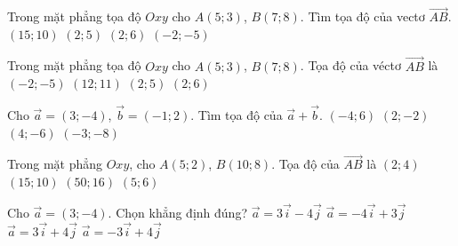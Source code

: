 

\begin{ex}%
	Trong mặt phẳng tọa độ $Oxy$ cho  $A(5; 3)$, $B(7; 8)$. Tìm tọa độ của vectơ $\overrightarrow{AB}$.
	 \choice
		 {$(15; 10)$}
		{\True $(2;  5)$}
		{$(2; 6)$} 
		 {$(-2;-5)$}
\end{ex}

\begin{ex}%
	Trong mặt phẳng tọa độ  $Oxy$ cho $A(5; 3)$, $B(7; 8)$. Tọa độ của véctơ $\overrightarrow{AB}$ là
	 \choice
		 {$(-2;-5)$}
		 {$(12; 11)$}
		{\True $(2;  5)$}
		{$(2; 6)$} 
\end{ex}

\begin{ex}%
	Cho $\overrightarrow{a}=(3;-4)$, $\overrightarrow{b}=(-1; 2)$. Tìm tọa độ  của $\overrightarrow{a}+\overrightarrow{b}$.
	 \choice
		{$(-4;  6)$}
		{\True  $(2;-2)$}
		{$(4;-6)$} 
		{$(-3;-8)$} 
\end{ex}

\begin{ex}%
	Trong mặt phẳng $Oxy$, cho $A(5; 2)$, $B(10; 8)$. Tọa độ của $\overrightarrow{AB}$ là 
	\choice 
		 {$(2; 4)$}
		{\True $(15; 10)$} 
		 {$(50; 16)$}
		{$(5;  6)$}
\end{ex}

\begin{ex}%
	 Cho $\overrightarrow{a}=(3;-4)$. Chọn khẳng định đúng?
	 \choice
		{\True $\overrightarrow{a}=3\overrightarrow{i}-4  \overrightarrow{j}$}
		{$\overrightarrow{a}=-4\overrightarrow{i}+3 \overrightarrow{j}$} 
		 {$\overrightarrow{a}=3\overrightarrow{i}+4 \overrightarrow{j}$}
		 {$\overrightarrow{a}=-3\overrightarrow{i}+4 \overrightarrow{j}$}
\end{ex}

